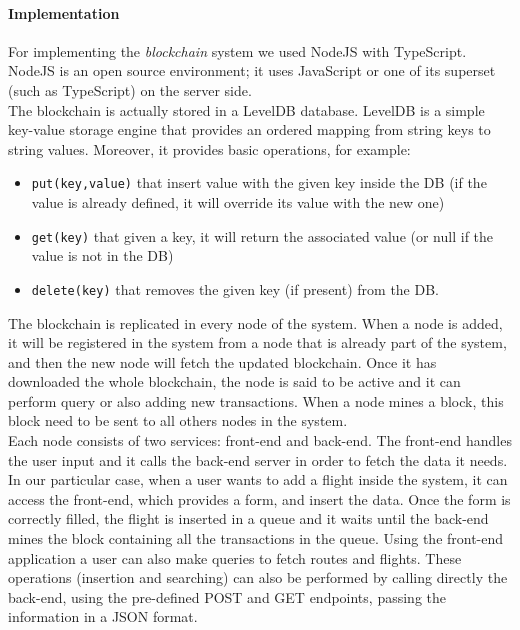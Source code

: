 \documentclass[11pt]{scrartcl} %
\begin{document}
\paragraph*{\textbf{Implementation}} For implementing the \textit{blockchain} system  we used NodeJS with TypeScript. NodeJS is an open source environment; it uses JavaScript or one of its superset (such as TypeScript) on the server side.\\

The blockchain is actually stored in a LevelDB database. LevelDB is a simple  key-value storage engine that provides an ordered mapping from string keys to string values. Moreover, it provides basic operations, for example:
\begin{itemize}
\item[\adforn{43}] \texttt{put(key,value)} that insert value with the given key inside the DB (if the value is already defined, it will override its value with the new one)
\item[\adforn{43}] \texttt{get(key)} that given a key, it will return the associated value (or null if the value is not in the DB)
\item[\adforn{43}] \texttt{delete(key)} that removes the given key (if present) from  the DB.
\end{itemize}

The blockchain is replicated in every node  of the system. When a node is added, it will be registered in the system from a node that is already part of the system, and then the new node will fetch the updated blockchain. Once it has downloaded the whole blockchain, the node is said to be  active and it  can perform query or also adding new transactions. When a node mines a block, this block need to be sent to all others nodes in the system.\\

Each node consists of two services: front-end and back-end. The  front-end handles the user input and it calls the back-end server in order to fetch the data it needs. In our particular case, when a user wants to add a flight inside the system, it can access the front-end, which provides a form, and insert the data. Once the form is correctly filled, the flight is inserted in a queue and it waits until the back-end mines the block containing all the transactions in the queue. Using the front-end application a user can also make queries to fetch routes and flights. These operations (insertion and searching) can also be performed by calling directly the back-end, using the pre-defined POST and GET endpoints, passing the information in a JSON format.
\end{document}
